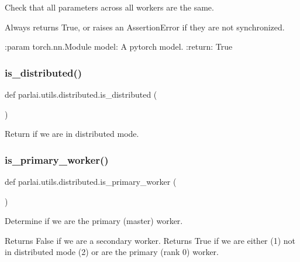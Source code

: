 \begin{DoxyVerb}Check that all parameters across all workers are the same.

Always returns True, or raises an AssertionError if they are not
synchronized.

:param torch.nn.Module model: A pytorch model.
:return: True
\end{DoxyVerb}
 \mbox{\label{namespaceparlai_1_1utils_1_1distributed_a023acb5e3b66e1f27e21247c35661279}} 
\subsubsection{\texorpdfstring{is\+\_\+distributed()}{is\_distributed()}}
{\footnotesize\ttfamily def parlai.\+utils.\+distributed.\+is\+\_\+distributed (\begin{DoxyParamCaption}{ }\end{DoxyParamCaption})}

\begin{DoxyVerb}Return if we are in distributed mode.
\end{DoxyVerb}
 \mbox{\label{namespaceparlai_1_1utils_1_1distributed_a9bb1dac198180590ef8c6b6c6f9fc2c4}} 
\subsubsection{\texorpdfstring{is\+\_\+primary\+\_\+worker()}{is\_primary\_worker()}}
{\footnotesize\ttfamily def parlai.\+utils.\+distributed.\+is\+\_\+primary\+\_\+worker (\begin{DoxyParamCaption}{ }\end{DoxyParamCaption})}

\begin{DoxyVerb}Determine if we are the primary (master) worker.

Returns False if we are a secondary worker. Returns True if we are either (1) not in
distributed mode (2) or are the primary (rank 0) worker.
\end{DoxyVerb}
 \mbox{\label{namespaceparlai_1_1utils_1_1distributed_a99b61b4756577c6542039c238d670dba}} 
